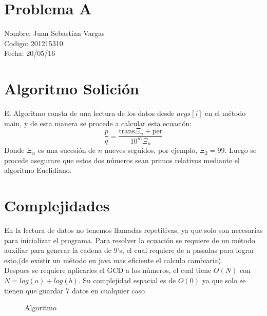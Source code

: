 \documentclass{article}
\begin{document}
\section*{Problema A}
Nombre: Juan Sebastian Vargas\\
 Codigo: 201215310\\
Fecha: 20/05/16

\section{Algoritmo Solici\'on}
El Algoritmo consta de una lectura de los datos desde $args [i]$ en el método main, y de esta manera se procede a calcular esta ecuación: 
\begin{equation}
    \frac{p}{q}=\frac{\text{trans}\Xi_n+\text{per}}{10^m\Xi_n}
\end{equation}
Donde $\Xi_n $ es una sucesión de $n$ nueves seguidos, por ejemplo, $\Xi_2=99$.
Luego se procede asegurare que estos dos números sean primos relativos mediante el algoritmo Euclidiano. 

\section{Complejidades}
En la lectura de datos no tenemos llamadas repetitivas, ya que solo son necesarias para inicializar el programa. 
Para resolver la ecuación se requiere de un método auxiliar para generar la cadena de 9’s, el cual requiere de n pasadas para lograr esto,(de existir un método en java mas eficiente el calculo cambiaria). \\
Despues se requiere aplicarles el GCD a los números, el cual tiene $ O(N)$ con $N=log(a)+log(b)$.
Su complejidad espacial es de $O(0)$ ya que solo se tienen que guardar 7 datos en cualquier caso


 
\begin{figure}[h]

 \caption{Algoritmo}
 \label{Al}
\end{figure}
\end{document}
